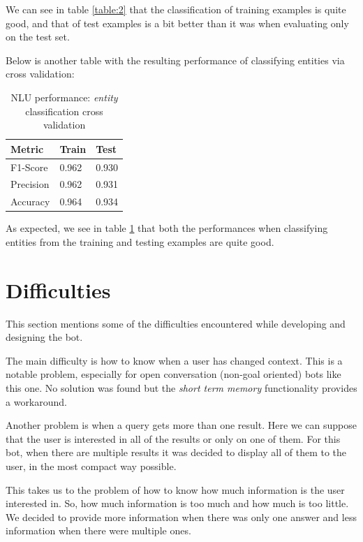 \documentclass[11pt,a4paper]{article}
\begin{document}
	We can see in table \ref{table:2} that the classification of training examples is quite good, and that of test examples is a bit better than it was when evaluating only on the test set. 
	
	Below is another table with the resulting performance of classifying entities via cross validation:
	
	\begin{table}[h!]
		\centering
		\begin{tabular}{l|l|l}
			\textbf{Metric} & \textbf{Train} & \textbf{Test} \\ 
			\hline 
			F1-Score & 0.962 & 0.930 \\ 
			\hline 
			Precision & 0.962 & 0.931 \\ 
			\hline 
			Accuracy & 0.964 & 0.934 \\ 
			\hline 
		\end{tabular} 
		\caption{NLU performance: \textit{entity} classification cross validation}
		\label{table:3}
	\end{table}	

	As expected, we see in table \ref{table:3} that both the performances when classifying entities from the training and testing examples are quite good. 
	

\section{Difficulties}
\label{sec-difficulties}

	This section mentions some of the difficulties encountered while developing and designing the bot.

	The main difficulty is how to know when a user has changed context. This is a notable problem, especially for open conversation (non-goal oriented) bots like this one. No solution was found but the \textit{short term memory} functionality provides a workaround.
	
	Another problem is when a query gets more than one result. Here we can suppose that the user is interested in all of the results or only on one of them. For this bot, when there are multiple results it was decided to display all of them to the user, in the most compact way possible.
	
	This takes us to the problem of how to know how much information is the user interested in. So, how much information is too much and how much is too little. We decided to provide more information when there was only one answer and less information when there were multiple ones.
	
\end{document}
